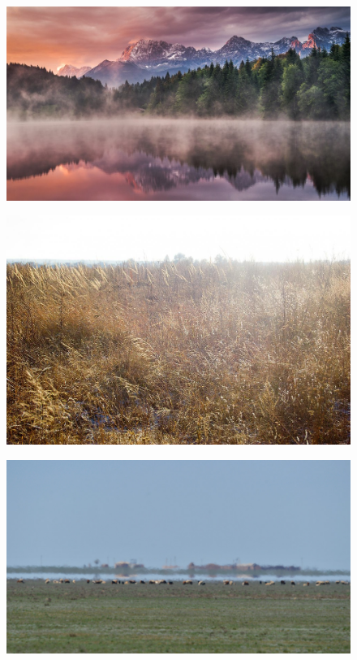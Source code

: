 \begin{figure}[H]
    \centering
    \includegraphics[width=\linewidth]{fogs/fog16.jpg} 
    \caption{}
    \label{fig:r16}
\end{figure}

\begin{figure}[H]
    \centering
    \includegraphics[width=\linewidth]{fogs/fog17.jpg} 
    \caption{}
    \label{fig:r17}
\end{figure}

\begin{figure}[H]
    \centering
    \includegraphics[width=\linewidth]{fogs/fog18.jpg} 
    \caption{}
    \label{fig:r18}
\end{figure}